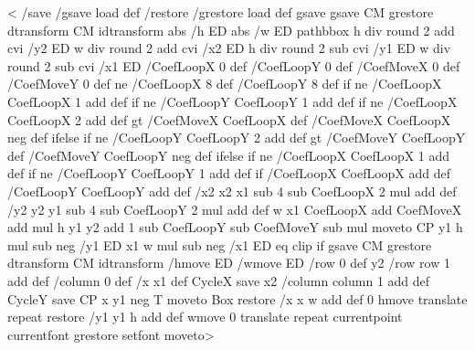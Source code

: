 <
  \ifPSTlualatex
    /save /gsave load def
    /restore /grestore load def
  \fi
  gsave
    gsave \tx@STV CM grestore dtransform CM idtransform
    abs /h ED abs /w ED
    pathbbox
    h div round 2 add cvi /y2 ED
    w div round 2 add cvi /x2 ED
    h div round 2 sub cvi /y1 ED
    w div round 2 sub cvi /x1 ED
    /CoefLoopX 0 def
    /CoefLoopY 0 def
    /CoefMoveX 0 def
    /CoefMoveY 0 def
    \psk@boxfillangle{} ne {/CoefLoopX 8 def /CoefLoopY 8 def} if
    \psk@fillcyclex{} ne {/CoefLoopX CoefLoopX 1 add def} if
    \psk@fillcycley{} ne {/CoefLoopY CoefLoopY 1 add def} if
    \psk@fillmovex{} ne
      {/CoefLoopX CoefLoopX 2 add def
       \psk@fillmovex{} gt {/CoefMoveX CoefLoopX def}
                           {/CoefMoveX CoefLoopX neg def} ifelse} if
    \psk@fillmovey{} ne
      {/CoefLoopY CoefLoopY 2 add def
       \psk@fillmovey{} gt {/CoefMoveY CoefLoopY def}
                           {/CoefMoveY CoefLoopY neg def} ifelse} if
    \psk@fillsepx{} ne {/CoefLoopX CoefLoopX 1 add def} if
    \psk@fillsepy{} ne {/CoefLoopY CoefLoopY 1 add def} if
    /CoefLoopX CoefLoopX \psk@fillloopaddx\space add def
    /CoefLoopY CoefLoopY \psk@fillloopaddy\space add def
    /x2 x2 x1 sub 4 sub CoefLoopX 2 mul add def
    /y2 y2 y1 sub 4 sub CoefLoopY 2 mul add def
    w x1 CoefLoopX add CoefMoveX add mul
      h y1 y2 add 1 sub CoefLoopY sub CoefMoveY sub mul moveto
    CP
    y1 h mul sub neg /y1 ED
    x1 w mul sub neg /x1 ED
     eq {clip} if
    \psk@fillmovex\space \psk@fillmovey
    gsave \tx@STV CM grestore dtransform CM idtransform
    /hmove ED /wmove ED
    /row 0 def
   y2 {
       /row row 1 add def
       /column 0 def
       /x x1 def
       CycleX
       save
       x2 {
          /column column 1 add def
          CycleY
          save CP x y1
          \ifx\VTeXversion\undefined
          \else
          neg
          \fi
  T moveto Box restore
          /x x w add def
          0 hmove translate
          } repeat
       restore
       /y1 y1 h add def
       wmove 0 translate
       } repeat
  currentpoint currentfont grestore setfont moveto>
\fi

